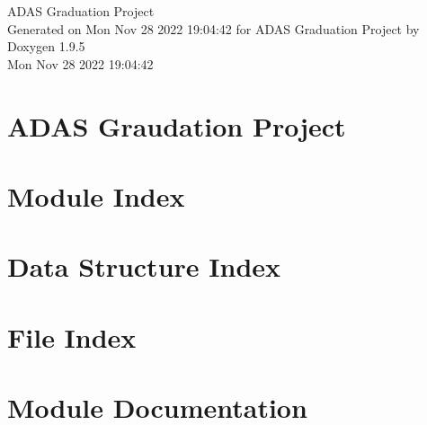 \documentclass[twoside]{book}
\newcommand{\+}{\discretionary{\mbox{\scriptsize$\hookleftarrow$}}{}{}}
\newcommand{\clearemptydoublepage}{%
    \newpage{\pagestyle{empty}\cleardoublepage}%
  }
\begin{document}
  \raggedbottom
    \hypersetup{pageanchor=false,
                bookmarksnumbered=true,
                pdfencoding=unicode
               }
  \begin{titlepage}
  \vspace*{7cm}
  \begin{center}%
  {\Large ADAS Graduation Project}\\
  \vspace*{1cm}
  {\large Generated on Mon Nov 28 2022 19\+:04\+:42 for ADAS Graduation Project by Doxygen 1.9.5}\\
    \vspace*{0.5cm}
    {\small Mon Nov 28 2022 19:04:42}
  \end{center}
  \end{titlepage}
  \clearemptydoublepage
  \tableofcontents
  \clearemptydoublepage
  \hypersetup{pageanchor=true}
\chapter{ADAS Graudation Project}
\label{index}\hypertarget{index}{}
\chapter{Module Index}

\chapter{Data Structure Index}

\chapter{File Index}

\chapter{Module Documentation}
















\end{document}
